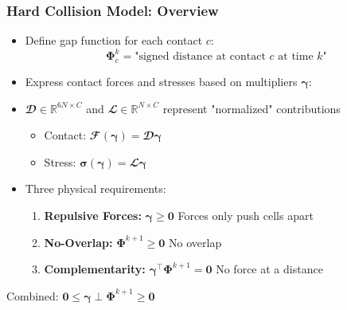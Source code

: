 \documentclass[
	10pt,
	t
]{beamer}
\begin{document}
\begin{frame}
    \frametitle{Hard Collision Model: Overview}

    \begin{itemize}
        \item Define gap function for each contact $c$:
              \begin{equation*}
                  \boldsymbol{\Phi}^k_c = \text{"signed distance at contact } c \text{ at time } k  \text{"}
              \end{equation*}

        \item Express contact forces and stresses based on multipliers $\boldsymbol{\gamma}$:
        \item $\mathbfcal{D} \in \mathbb{R}^{6N \times C}$ and $\mathbfcal{L} \in \mathbb{R}^{N \times C}$ represent "normalized" contributions
              \begin{itemize}
                  \item Contact: $\mathbfcal{F}(\boldsymbol{\gamma}) = \mathbfcal{D} \boldsymbol{\gamma}$
                  \item Stress: $\boldsymbol{\sigma}(\boldsymbol{\gamma}) = \mathbfcal{L} \boldsymbol{\gamma}$
              \end{itemize}
    \end{itemize}

    \vspace{0.2cm}

    \begin{itemize}
        \item Three physical requirements:
              \begin{enumerate}
                  \item \textbf{Repulsive Forces:} $\boldsymbol{\gamma} \geq \mathbf{0}$ Forces only push cells apart
                  \item \textbf{No-Overlap:} $\boldsymbol{\Phi}^{k+1} \geq \mathbf{0}$ No overlap
                  \item \textbf{Complementarity:} $\boldsymbol{\gamma}^\top \boldsymbol{\Phi}^{k+1} = \mathbf{0}$ No force at a distance
              \end{enumerate}
    \end{itemize}

    \begin{center}
        Combined: $\mathbf{0} \leq \boldsymbol{\gamma} \perp \boldsymbol{\Phi}^{k+1} \geq \mathbf{0}$
    \end{center}
\end{frame}
\end{document}
